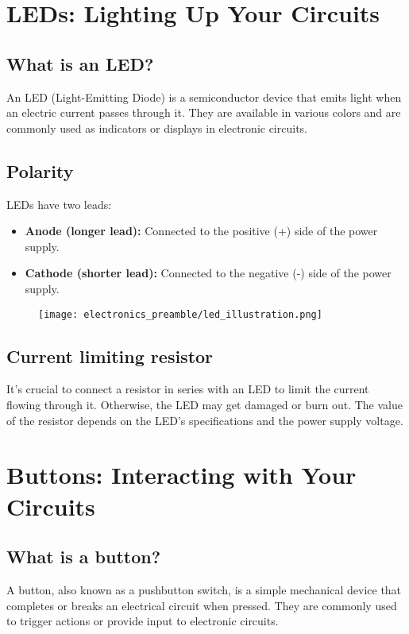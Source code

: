 \section{LEDs: Lighting Up Your Circuits}
\subsection{What is an LED?}
An LED (Light-Emitting Diode) is a semiconductor device that emits light when an electric current
passes through it. They are available in various colors and are commonly used as indicators or
displays in electronic circuits.

\subsection{Polarity}
LEDs have two leads:
\begin{itemize}
\item \textbf{Anode (longer lead):} Connected to the positive (+) side of the power supply.
\item \textbf{Cathode (shorter lead):} Connected to the negative (-) side of the power supply.
\end{itemize}

\begin{figure}[H]
\centering
    \texttt{[image: electronics\_preamble/led\_illustration.png]}
\end{figure}

\subsection{Current limiting resistor}
It's crucial to connect a resistor in series with an LED to limit the current flowing through it.
Otherwise, the LED may get damaged or burn out. The value of the resistor depends on the LED's
specifications and the power supply voltage.

\section{Buttons: Interacting with Your Circuits} \label{button_basics}
\subsection{What is a button?}
A button, also known as a pushbutton switch, is a simple mechanical device that completes or breaks
an electrical circuit when pressed. They are commonly used to trigger actions or provide input to
electronic circuits.

